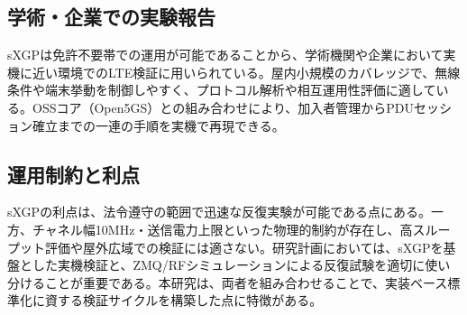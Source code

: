 \subsection{学術・企業での実験報告}

sXGPは免許不要帯での運用が可能であることから、学術機関や企業において実機に近い環境でのLTE検証に用いられている。屋内小規模のカバレッジで、無線条件や端末挙動を制御しやすく、プロトコル解析や相互運用性評価に適している。OSSコア（Open5GS）との組み合わせにより、加入者管理からPDUセッション確立までの一連の手順を実機で再現できる。

\subsection{運用制約と利点}

sXGPの利点は、法令遵守の範囲で迅速な反復実験が可能である点にある。一方、チャネル幅10MHz・送信電力上限といった物理的制約が存在し、高スループット評価や屋外広域での検証には適さない。研究計画においては、sXGPを基盤とした実機検証と、ZMQ/RFシミュレーションによる反復試験を適切に使い分けることが重要である。本研究は、両者を組み合わせることで、実装ベース標準化に資する検証サイクルを構築した点に特徴がある。

